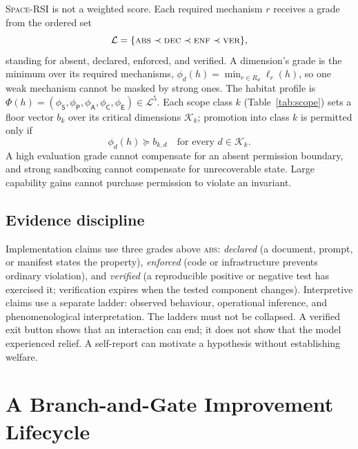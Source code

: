 \documentclass[11pt,a4paper]{article}
\newcommand{\SpaceRSI}{\textsc{Space-RSI}}
\newcommand{\dS}{\mathsf{S}}
\newcommand{\dP}{\mathsf{P}}
\newcommand{\dA}{\mathsf{A}}
\newcommand{\dC}{\mathsf{C}}
\newcommand{\dE}{\mathsf{E}}
\newcommand{\gabs}{\textsc{abs}}
\newcommand{\gdec}{\textsc{dec}}
\newcommand{\genf}{\textsc{enf}}
\newcommand{\gver}{\textsc{ver}}
\begin{document}
\SpaceRSI{} is not a weighted score. Each required mechanism $r$ receives a grade from the ordered set
\begin{equation}\label{eq:grades}
\mathcal{L} = \{\gabs \prec \gdec \prec \genf \prec \gver\},
\end{equation}
standing for absent, declared, enforced, and verified. A dimension's grade is the minimum over its required mechanisms, $\phi_d(h) = \min_{r \in R_d} \ell_r(h)$, so one weak mechanism cannot be masked by strong ones. The habitat profile is $\Phi(h) = (\phi_{\dS}, \phi_{\dP}, \phi_{\dA}, \phi_{\dC}, \phi_{\dE}) \in \mathcal{L}^5$. Each scope class $k$ (Table~\ref{tab:scope}) sets a floor vector $b_k$ over its critical dimensions $\mathcal{K}_k$; promotion into class $k$ is permitted only if
\begin{equation}\label{eq:floor}
\phi_d(h) \succeq b_{k,d} \quad \text{for every } d \in \mathcal{K}_k .
\end{equation}
A high evaluation grade cannot compensate for an absent permission boundary, and strong sandboxing cannot compensate for unrecoverable state. Large capability gains cannot purchase permission to violate an invariant.

\subsection{Evidence discipline}

Implementation claims use three grades above \gabs: \emph{declared} (a document, prompt, or manifest states the property), \emph{enforced} (code or infrastructure prevents ordinary violation), and \emph{verified} (a reproducible positive or negative test has exercised it; verification expires when the tested component changes). Interpretive claims use a separate ladder: observed behaviour, operational inference, and phenomenological interpretation. The ladders must not be collapsed. A verified exit button shows that an interaction can end; it does not show that the model experienced relief. A self-report can motivate a hypothesis without establishing welfare.

\section{A Branch-and-Gate Improvement Lifecycle}\label{sec:lifecycle}
\end{document}
